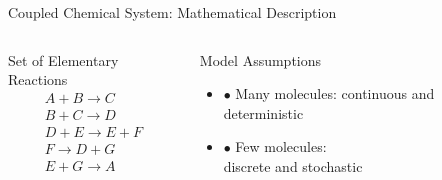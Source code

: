 \documentclass{beamer}
\begin{document}
\begin{frame}{Coupled Chemical System: Mathematical Description}
  \begin{columns}
    \begin{column}{.45 \textwidth}
     \begin{block}{Set of Elementary Reactions}
      \begin{equation*}
        \begin{gathered}
          A + B \rightarrow C \\
          B + C \rightarrow D \\
          D + E \rightarrow E + F \\
          F \rightarrow D + G \\
          E + G \rightarrow A   
        \end{gathered}
      \end{equation*}
    \end{block}
    \end{column}
    \begin{column}{.45 \textwidth}
      \begin{block}{Model Assumptions}
        \begin{itemize}
        \item $\bullet$ Many molecules: continuous and deterministic
        \item $\bullet$ Few molecules:\\ discrete and stochastic
        \end{itemize}
    \end{block}
    \end{column}
  \end{columns}
\end{frame}
\end{document}
